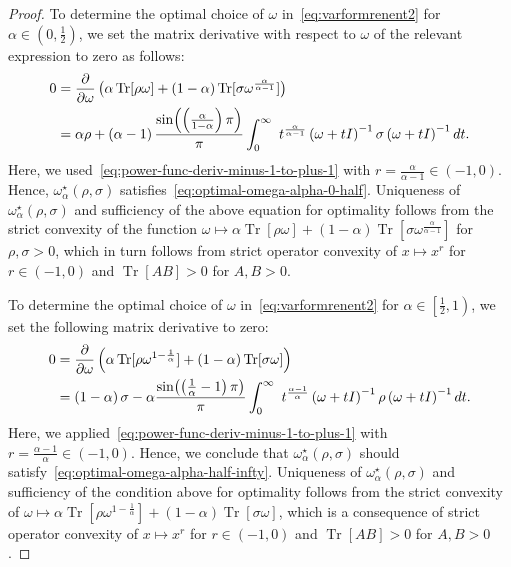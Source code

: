 \documentclass[a4paper,onecolumn,11pt,accepted=2026-05-12]{quantumarticle}
\DeclareMathOperator{\Tr}{Tr}
\begin{document}
\begin{proof}
To determine the optimal choice of $\omega$ in~\eqref{eq:varformrenent2} for $\alpha\in\left(0,\frac{1}{2}\right)$,
we set the  matrix derivative with respect to $\omega$ of the relevant expression to zero as follows:
\begin{align}
0&=  \frac{\partial}{\partial\omega}\left(\alpha\Tr[\rho\omega]+\left(1-\alpha\right)\Tr[\sigma\omega^{\frac{\alpha}{\alpha-1}}]\right) \nonumber \\
 &  =\alpha\rho+\left(\alpha-1\right)\frac{\sin\!\left(\left(\frac{\alpha}{1-\alpha}\right)\pi\right)}{\pi}\int_{0}^{\infty}\ t^{\frac{\alpha}{\alpha-1}}\left(\omega+tI\right)^{-1}\sigma\left(\omega+tI\right)^{-1}dt.\notag
\end{align}
Here, we used~\eqref{eq:power-func-deriv-minus-1-to-plus-1} with  $r=\frac{\alpha}{\alpha-1}\in\left(-1,0\right)$. Hence, $\omega_{\alpha}^{\star}(\rho,\sigma)$ satisfies~\eqref{eq:optimal-omega-alpha-0-half}.  Uniqueness of $\omega_{\alpha}^{\star}(\rho,\sigma)$ and sufficiency of the above equation for optimality follows from the strict convexity of the function $\omega\mapsto\alpha\Tr[\rho\omega]+\left(1-\alpha\right)\Tr[\sigma\omega^{\frac{\alpha}{\alpha-1}}]$
for $\rho,\sigma>0$, which in turn follows from strict operator convexity of $x \mapsto x^{r}$ for $r \in (-1,0)$ and $\Tr[AB]> 0$ for $A,B >0$.

To determine the optimal choice of $\omega$ in~\eqref{eq:varformrenent2} for $\alpha\in\left[\frac{1}{2},1\right)$, 
we set the following matrix derivative to zero:
\begin{align}
 0&= \frac{\partial}{\partial\omega}\left(\alpha\Tr[\rho\omega^{1-\frac{1}{\alpha}}]+\left(1-\alpha\right)\Tr[\sigma\omega]\right)\nonumber \\ 
  & =\left(1-\alpha\right)\sigma-\alpha\frac{\sin\!\left(\left(\frac{1}{\alpha}-1\right)\pi\right)}{\pi}\int_{0}^{\infty}\ t^{\frac{\alpha-1}{\alpha}}\left(\omega+tI\right)^{-1}\rho\left(\omega+tI\right)^{-1}dt. \notag 
\end{align}
Here, we applied~\eqref{eq:power-func-deriv-minus-1-to-plus-1} with $r=\frac{\alpha-1}{\alpha} \in (-1,0)$.
Hence, we conclude that $\omega_{\alpha}^{\star}(\rho,\sigma)$ should satisfy~\eqref{eq:optimal-omega-alpha-half-infty}. Uniqueness of $\omega_{\alpha}^{\star}(\rho,\sigma)$ and sufficiency of the condition above for optimality follows from the strict convexity of $\omega\mapsto\alpha\Tr[\rho\omega^{1-\frac{1}{\alpha}}]+\left(1-\alpha\right)\Tr[\sigma\omega]$, which is a consequence of strict operator convexity of $x \mapsto x^{r}$ for $r \in (-1,0)$ and $\Tr[AB]> 0$ for $A,B >0$.


\end{proof}
\end{document}
